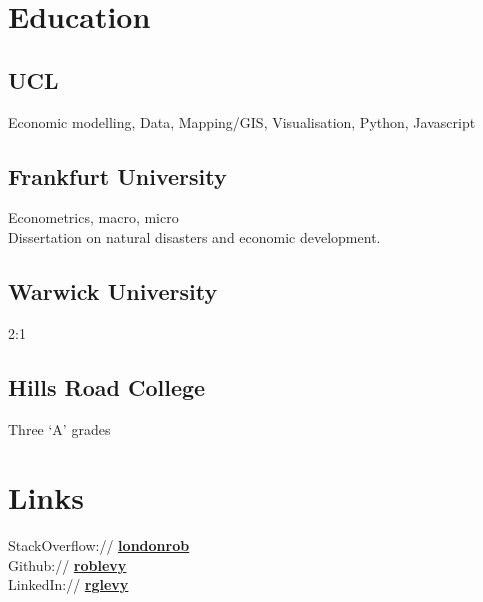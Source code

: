 \documentclass[a4paper,nomath]{deedy-resume} %
\begin{document}
\begin{paracol}{2}

    \section{Education} 
    
    \subsection{UCL}
    
    Economic modelling, Data, Mapping/GIS, Visualisation, Python, Javascript
    \sectionspace

    \subsection{Frankfurt University}

    Econometrics, macro, micro\\
    Dissertation on natural disasters and economic development.
    \sectionspace %

    \subsection{Warwick University}
    2:1
    \sectionspace %


    \subsection{Hills Road College}
    Three `A' grades\\
    \sectionspace %


    \section{Links} 

    StackOverflow:// \href{http://stackoverflow.com/londonrob}{\bf londonrob} \\
    Github:// \href{https://github.com/roblevy}{\bf roblevy} \\
    LinkedIn:// \href{http://uk.linkedin.com/in/rglevy}{\bf rglevy} \\

    \sectionspace %


\end{paracol}
\end{document}
